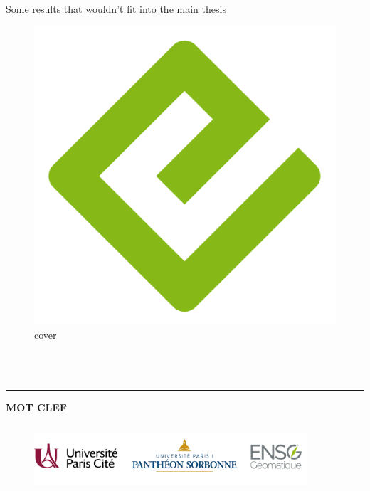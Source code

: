 \documentclass[
  12pt,
  a4paper,
]{scrbook}
\begin{document}
Some results that wouldn't fit into the main thesis

\begin{figure}

{\centering \includegraphics{./cover.png}

}

\caption{cover}

\end{figure}


\backmatter

\cleardoublepage
{}  
\pagestyle{empty}

\noindent
\textbf{\Large\MyTitle} \\

\noindent
\textbf{\textit{\MyAuthor}} \\
\noindent
\MyDate

\vspace{3mm}


\noindent
\rule{\textwidth}{0.7pt}


\vspace{5mm}




\vspace{10mm}


\noindent
\textbf{MOT CLEF}\\



\begin{figure}[b]

\centerline{\includegraphics[width=4in,height=1in]{figures/logos/logos3.jpg}}
\end{figure}



\clearpage

\restoregeometry
\end{document}
